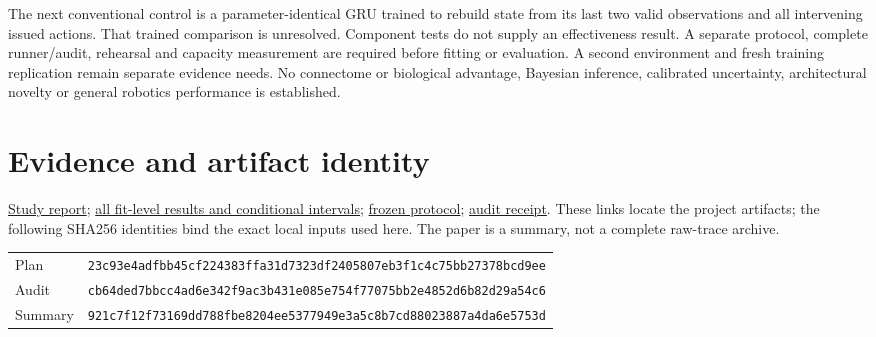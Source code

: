 \documentclass[10pt,letterpaper]{article}
\newcommand{\repo}{https://github.com/kw2828/OpenJev}
\begin{document}
The next conventional control is a parameter-identical GRU trained to rebuild
state from its last two valid observations and all intervening issued actions.
That trained comparison is unresolved. Component tests do not supply an
effectiveness result. A separate protocol, complete runner/audit, rehearsal
and capacity measurement are required before fitting or evaluation. A second
environment and fresh training replication remain separate evidence needs.
No connectome or biological advantage, Bayesian inference, calibrated
uncertainty, architectural novelty or general robotics performance is established.

\section*{Evidence and artifact identity}
\small
\href{\repo/blob/main/research/reacher-geometry-memory.md}{Study report};
\href{\repo/blob/main/evidence/reacher-geometry-memory-v1/report/tables.md}{all fit-level results and conditional intervals};
\href{\repo/blob/main/evidence/reacher-geometry-memory-v1/protocol/plan.json}{frozen protocol};
\href{\repo/blob/main/evidence/reacher-geometry-memory-v1/audit/receipt.json}{audit receipt}.
These links locate the project artifacts; the following SHA256 identities bind
the exact local inputs used here. The paper is a summary, not a complete raw-trace archive.

\begin{tabular}{@{}ll@{}}
Plan & \texttt{23c93e4adfbb45cf224383ffa31d7323df2405807eb3f1c4c75bb27378bcd9ee}\\
Audit & \texttt{cb64ded7bbcc4ad6e342f9ac3b431e085e754f77075bb2e4852d6b82d29a54c6}\\
Summary & \texttt{921c7f12f73169dd788fbe8204ee5377949e3a5c8b7cd88023887a4da6e5753d}
\end{tabular}
\end{document}
